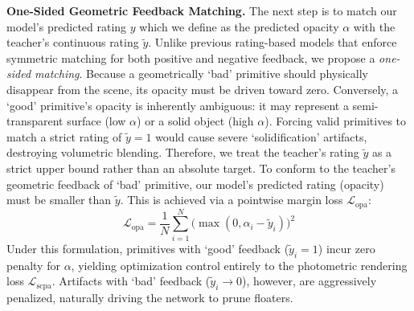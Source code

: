 \noindent \textbf{One-Sided Geometric Feedback Matching.}
The next step is to match our model's predicted rating $y$ which we define as the predicted opacity $\alpha$ with the teacher's continuous rating $\tilde{y}$. Unlike previous rating-based models \cite{luu2025enhancing, white2024rating} that enforce symmetric matching for both positive and negative feedback, we propose a \textit{one-sided matching}. Because a geometrically `bad' primitive should physically disappear from the scene, its opacity must be driven toward zero. Conversely, a `good' primitive's opacity is inherently ambiguous: it may represent a semi-transparent surface (low $\alpha$) or a solid object (high $\alpha$). Forcing valid primitives to match a strict rating of $\tilde{y}=1$ would cause severe `solidification' artifacts, destroying volumetric blending. Therefore, we treat the teacher's rating $\tilde{y}$ as a strict upper bound rather than an absolute target. To conform to the teacher's geometric feedback of `bad' primitive, our model's predicted rating (opacity) must be smaller than $\tilde{y}$. This is achieved via a pointwise margin loss $\mathcal{L}_{\text{opa}}$:
\begin{equation}
    \mathcal{L}_{\text{opa}} = \frac{1}{N} \sum_{i=1}^{N} \Big( \max(0, \alpha_i - \tilde{y}_i) \Big)^2
    \label{eq:opa_loss}
\end{equation}
Under this formulation, primitives with `good' feedback ($\tilde{y}_i = 1$) incur zero penalty for $\alpha$, yielding optimization control entirely to the photometric rendering loss $\mathcal{L}_{\text{scpa}}$. Artifacts with `bad' feedback ($\tilde{y}_i \to 0$), however, are aggressively penalized, naturally driving the network to prune floaters.


